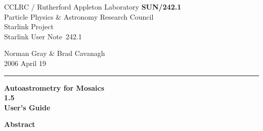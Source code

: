 \documentclass[twoside,11pt]{article}
\newcommand{\stardoccategory}  {Starlink User Note}
\newcommand{\stardocinitials}  {SUN}
\newcommand{\stardocnumber}    {242.1}
\newcommand{\stardocauthors}   {Norman Gray \& Brad Cavanagh}
\newcommand{\stardocdate}      {2006 April 19}
\newcommand{\stardoctitle}     {Autoastrometry for Mosaics}
\newcommand{\stardocversion}   {1.5}
\newcommand{\stardocmanual}    {User's Guide}
\newcommand{\stardocname}{\stardocinitials /\stardocnumber}
\newenvironment{latexonly}{}{}
\begin{document}
\thispagestyle{empty}

\begin{latexonly}
   CCLRC / {\sc Rutherford Appleton Laboratory} \hfill {\bf \stardocname}\\
   {\large Particle Physics \& Astronomy Research Council}\\
   {\large Starlink Project\\}
   {\large \stardoccategory\ \stardocnumber}
   \begin{flushright}
   \stardocauthors\\
   \stardocdate
   \end{flushright}
   \vspace{-4mm}
   \rule{\textwidth}{0.5mm}
   \vspace{5mm}
   \begin{center}
   {\Huge\bf  \stardoctitle \\ [2.5ex]}
   {\LARGE\bf \stardocversion \\ [4ex]}
   {\Huge\bf  \stardocmanual}
   \end{center}
   \vspace{5mm}

   \vspace{10mm}
   \begin{center}
      {\Large\bf Abstract}
   \end{center}
\end{latexonly}
\end{document}
